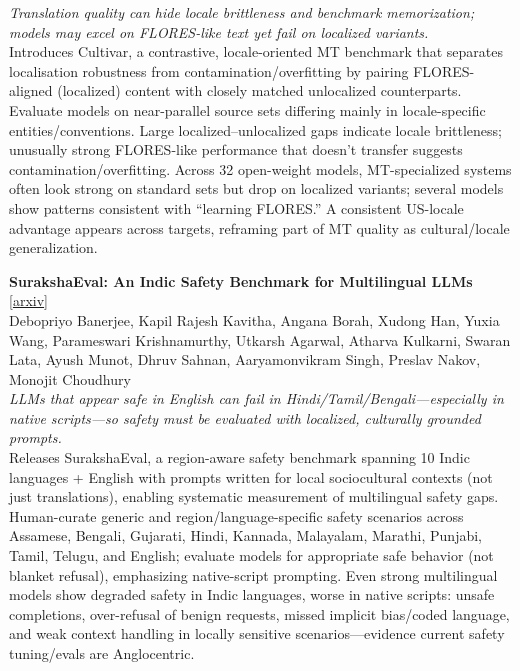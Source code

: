 \documentclass[12pt,letterpaper]{article}
\begin{document}
{\small\textit{Translation quality can hide locale brittleness and benchmark memorization; models may excel on FLORES-like text yet fail on localized variants.}}\\[1pt]
{\footnotesize Introduces Cultivar, a contrastive, locale-oriented MT benchmark that separates localisation robustness from contamination/overfitting by pairing FLORES-aligned (localized) content with closely matched unlocalized counterparts. Evaluate models on near-parallel source sets differing mainly in locale-specific entities/conventions. Large localized--unlocalized gaps indicate locale brittleness; unusually strong FLORES-like performance that doesn't transfer suggests contamination/overfitting. Across 32 open-weight models, MT-specialized systems often look strong on standard sets but drop on localized variants; several models show patterns consistent with ``learning FLORES.'' A consistent US-locale advantage appears across targets, reframing part of MT quality as cultural/locale generalization.}

\medskip

{\small\textbf{SurakshaEval: An Indic Safety Benchmark for Multilingual LLMs}} {\scriptsize[\href{https://arxiv.org/abs/2608.07862}{arxiv}]}\\
{\scriptsize Debopriyo Banerjee, Kapil Rajesh Kavitha, Angana Borah, Xudong Han, Yuxia Wang, Parameswari Krishnamurthy, Utkarsh Agarwal, Atharva Kulkarni, Swaran Lata, Ayush Munot, Dhruv Sahnan, Aaryamonvikram Singh, Preslav Nakov, Monojit Choudhury}\\

{\small\textit{LLMs that appear safe in English can fail in Hindi/Tamil/Bengali---especially in native scripts---so safety must be evaluated with localized, culturally grounded prompts.}}\\[1pt]
{\footnotesize Releases SurakshaEval, a region-aware safety benchmark spanning 10 Indic languages + English with prompts written for local sociocultural contexts (not just translations), enabling systematic measurement of multilingual safety gaps. Human-curate generic and region/language-specific safety scenarios across Assamese, Bengali, Gujarati, Hindi, Kannada, Malayalam, Marathi, Punjabi, Tamil, Telugu, and English; evaluate models for appropriate safe behavior (not blanket refusal), emphasizing native-script prompting. Even strong multilingual models show degraded safety in Indic languages, worse in native scripts: unsafe completions, over-refusal of benign requests, missed implicit bias/coded language, and weak context handling in locally sensitive scenarios---evidence current safety tuning/evals are Anglocentric.}
\end{document}
